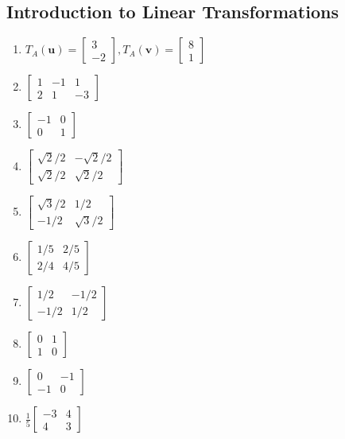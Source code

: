 \documentclass{article}
\newcommand{\vu}{\mathbf{u}}
\newcommand{\vv}{\mathbf{v}}
\newcommand{\colvecTwo}[2]{
  \begin{bmatrix}
    #1 \\
    #2
  \end{bmatrix}
}
\begin{document}
\subsection{Introduction to Linear Transformations}
\begin{enumerate}
	\item $T_A(\vu)=\colvecTwo{3}{-2}, T_A(\vv)=\colvecTwo{8}{1}$
	      \setcounter{enumi}{12}
	\item $
		      \begin{bmatrix}
			      1 & -1 & 1  \\
			      2 & 1  & -3
		      \end{bmatrix}$
	      \setcounter{enumi}{14}
	\item $
		      \begin{bmatrix}
			      -1 & 0 \\
			      0  & 1
		      \end{bmatrix}$
	\item $
		      \begin{bmatrix}
			      \sqrt{2}/2 & -\sqrt{2}/2 \\
			      \sqrt{2}/2 & \sqrt{2}/2
		      \end{bmatrix}$
	      \setcounter{enumi}{20}
	\item $
		      \begin{bmatrix}
			      \sqrt{3}/2 & 1/2        \\
			      -1/2       & \sqrt{3}/2
		      \end{bmatrix}$
	\item $
		      \begin{bmatrix}
			      1/5 & 2/5 \\
			      2/4 & 4/5
		      \end{bmatrix}$
	\item $
		      \begin{bmatrix}
			      1/2  & -1/2 \\
			      -1/2 & 1/2
		      \end{bmatrix}$
	\item $\begin{bmatrix}
			      0 & 1 \\
			      1 & 0
		      \end{bmatrix}$
	\item $\begin{bmatrix}
			      0  & -1 \\
			      -1 & 0
		      \end{bmatrix}$
	      \setcounter{enumi}{26}
	\item $\frac{1}{5}\begin{bmatrix}-3 & 4 \\ 4 & 3\end{bmatrix}$

\end{enumerate}
\end{document}
